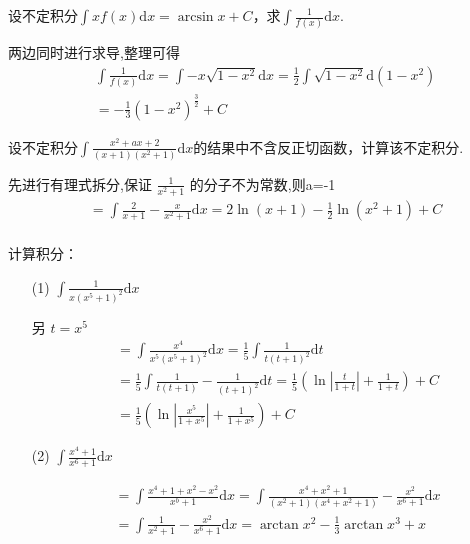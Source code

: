 \begin{xiti}
\begin{solution}
		\end{solution}
	\item 设不定积分$\int x f ( x ) \mathrm { d } x = \arcsin x + C$，求$\int \frac { 1 } { f ( x ) } \mathrm { d } x$.
	\begin{solution}
		两边同时进行求导,整理可得\\
		\begin{align*}
			& \int \frac{1}{f(x)} \mathrm{d} x =\int -x\sqrt{1-x^2} \mathrm{d}x =\frac{1}{2} \int \sqrt{1-x^2} \mathrm{d} (1-x^2) \\
			&=- \frac{1}{3} (1-x^2)^{\frac{3}{2}} + C
		\end{align*}
	\end{solution}
	\item 设不定积分$\int \frac { x ^ { 2 } + a x + 2 } { ( x + 1 ) \left( x ^ { 2 } + 1 \right) }\mathrm{d}x$的结果中不含反正切函数，计算该不定积分.
	\begin{solution}
		先进行有理式拆分,保证 $\frac{1}{x^2+1}$ 的分子不为常数,则a=-1
		\begin{align*}
			&= \int \frac{2}{x+1} -\frac{x}{x^2+1} \mathrm{d}x= 2 \ln (x+1)-\frac{1}{2} \ln \left(x^{2}+1\right)+C \\
		\end{align*}
	\end{solution}	
	\item 计算积分：
	\begin{enumerate}
		\item[(1)] $\int \frac { 1 } { x \left( x ^ { 5 } + 1 \right) ^ { 2 } }\mathrm{d}x$
		\begin{solution}
			另 $t=x^5$
		\begin{align*}
			&=\int \frac{x^4}{x^5(x^5+1)^2} \mathrm{d}x =  \frac{1}{5} \int \frac{1}{t(t+1)^2} \mathrm{ d}t\\
			&=\frac{1}{5} \int \frac{1}{t(t+1)}-\frac{1}{(t+1)^2} \mathrm{d}t = \frac{1}{5} ( \ln |\frac{t}{1+t}| +\frac{1}{1+t}) + C  \\
			&=\frac{1}{5} ( \ln |\frac{x^5}{1+x^5}| +\frac{1}{1+x^5}) + C
		\end{align*}
		\end{solution}
	
		
		\item[(2)]  $\int \frac { x ^ { 4 } + 1 } { x ^ { 6 } + 1 }\mathrm{d}x$
		\begin{solution}
		\begin{align*}
		&=\int \frac{x^{4}+1+x^{2}-x^{2}}{x^{b}+1} \mathrm{ d}x= \int \frac{x^4+x^2+1}{(x^2+1)(x^4+x^2+1)}-\frac{x^2}{x^6+1} \mathrm{ d}x \\
		&=\int \frac{1}{x^{2}+1}-\frac{x^{2}}{x^{6}+1} \mathrm{d} x =\arctan x^{2}-\frac{1}{3} \arctan x^{3}+x	
		\end{align*}
		\end{solution}	
		

\end{enumerate}
\end{xiti}
